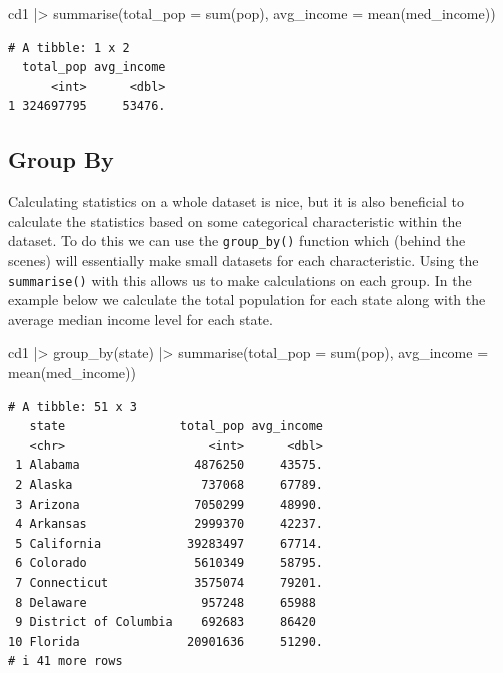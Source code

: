 \documentclass[
  letterpaper,
  DIV=11,
  numbers=noendperiod]{scrreprt}
\newenvironment{Shaded}{\begin{snugshade}}{\end{snugshade}}
\newcommand{\AttributeTok}[1]{\textcolor[rgb]{0.40,0.45,0.13}{#1}}
\newcommand{\FunctionTok}[1]{\textcolor[rgb]{0.28,0.35,0.67}{#1}}
\newcommand{\NormalTok}[1]{\textcolor[rgb]{0.00,0.23,0.31}{#1}}
\newcommand{\SpecialCharTok}[1]{\textcolor[rgb]{0.37,0.37,0.37}{#1}}
\begin{document}
\begin{Shaded}
\begin{Highlighting}[]
\NormalTok{cd1 }\SpecialCharTok{|\textgreater{}} \FunctionTok{summarise}\NormalTok{(}\AttributeTok{total\_pop =} \FunctionTok{sum}\NormalTok{(pop), }\AttributeTok{avg\_income =} \FunctionTok{mean}\NormalTok{(med\_income))}
\end{Highlighting}
\end{Shaded}

\begin{verbatim}
# A tibble: 1 x 2
  total_pop avg_income
      <int>      <dbl>
1 324697795     53476.
\end{verbatim}

\subsection{Group By}\label{group-by}

Calculating statistics on a whole dataset is nice, but it is also
beneficial to calculate the statistics based on some categorical
characteristic within the dataset. To do this we can use the
\texttt{group\_by()} function which (behind the scenes) will essentially
make small datasets for each characteristic. Using the
\texttt{summarise()} with this allows us to make calculations on each
group. In the example below we calculate the total population for each
state along with the average median income level for each state.

\begin{Shaded}
\begin{Highlighting}[]
\NormalTok{cd1 }\SpecialCharTok{|\textgreater{}} \FunctionTok{group\_by}\NormalTok{(state) }\SpecialCharTok{|\textgreater{}}
    \FunctionTok{summarise}\NormalTok{(}\AttributeTok{total\_pop =} \FunctionTok{sum}\NormalTok{(pop), }\AttributeTok{avg\_income =} \FunctionTok{mean}\NormalTok{(med\_income))}
\end{Highlighting}
\end{Shaded}

\begin{verbatim}
# A tibble: 51 x 3
   state                total_pop avg_income
   <chr>                    <int>      <dbl>
 1 Alabama                4876250     43575.
 2 Alaska                  737068     67789.
 3 Arizona                7050299     48990.
 4 Arkansas               2999370     42237.
 5 California            39283497     67714.
 6 Colorado               5610349     58795.
 7 Connecticut            3575074     79201.
 8 Delaware                957248     65988 
 9 District of Columbia    692683     86420 
10 Florida               20901636     51290.
# i 41 more rows
\end{verbatim}
\end{document}
